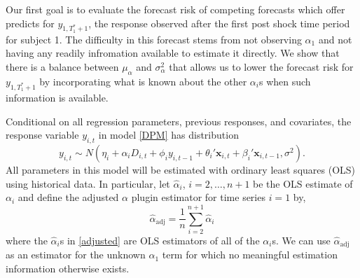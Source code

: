 \documentclass[11pt]{article}
\newcommand{\x}{\textbf{x}}
\begin{document}
Our first goal is to evaluate the forecast risk of competing forecasts which 
offer predicts for $y_{1, T_1^* + 1}$, the response observed after the first 
post shock time period for subject 1.  The difficulty in this forecast stems 
from not observing $\alpha_1$ and not having any readily infromation available 
to estimate it directly.  We show that there is a balance between $\mu_\alpha$ 
and $\sigma_\alpha^2$ that allows us to lower the forecast risk for 
$y_{1, T_1^* + 1}$ by incorporating what is known about the other $\alpha_i$s 
when such information is available.

Conditional on all regression parameters, previous responses, and covariates, 
the response variable $y_{i,t}$ in model \eqref{DPM} has distribution 
$$
  y_{i,t} 
    \sim N(\eta_i + \alpha_iD_{i,t} + \phi_i y_{i,t-1} + \theta_i'\x_{i,t} 
      + \beta_i'\x_{i,t-1}, \sigma^2).
$$
All parameters in this model will be estimated with ordinary least squares 
(OLS) using historical data.  In particular, let $\hat{\alpha}_i$, 
$i = 2, \ldots, n+1$ be the OLS estimate of $\alpha_i$ and define the 
adjusted $\alpha$ plugin estimator for time series $i=1$ by,
\begin{equation} \label{adjusted}
  \hat{\alpha}_{\text{adj}} = \frac{1}{n}\sum_{i=2}^{n+1}\hat{\alpha}_i
\end{equation}
where the $\hat{\alpha}_i$s in \eqref{adjusted} are OLS estimators of all of 
the $\alpha_i$s.  We can use $\hat{\alpha}_{\text{adj}}$ as an estimator for 
the unknown $\alpha_1$ term for which no meaningful estimation information 
otherwise exists. 
\end{document}
